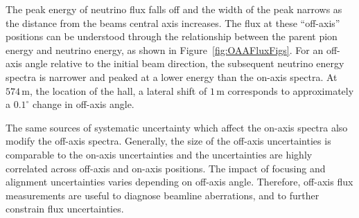 The peak energy of neutrino flux falls off and the width of the peak narrows as the distance from the beams central axis increases. The flux at these ``off-axis'' positions can be understood through the relationship between the parent pion energy and neutrino energy, as shown in Figure~\ref{fig:OAAFluxFigs}. For an off-axis angle relative to the initial beam direction, the subsequent neutrino energy spectra is narrower and peaked at a lower energy than the on-axis spectra. At $574\,\textrm{m}$, the location of the  hall, a lateral shift of $1\,\textrm{m}$ corresponds to approximately a $0.1^\circ$ change in off-axis angle.


The same sources of systematic uncertainty which affect the on-axis spectra also modify the off-axis spectra.  Generally, the size of the off-axis uncertainties is comparable to the on-axis uncertainties and the uncertainties are highly correlated across off-axis and on-axis positions. 
The impact of focusing and alignment uncertainties varies depending on off-axis angle.
Therefore, off-axis flux measurements are useful to diagnose beamline aberrations, and to further constrain flux uncertainties.

